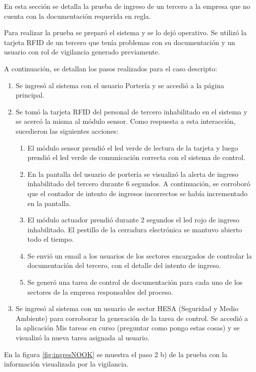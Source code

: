En esta sección se detalla la prueba de ingreso de un tercero a la empresa que no cuenta con la documentación requerida en regla.

Para realizar la prueba se preparó el sistema y se lo dejó operativo. Se utilizó la tarjeta RFID de un tercero que tenía problemas con su documentación y un usuario con rol de vigilancia generado previamente.

A continuación, se detallan los pasos realizados para el caso descripto:

\begin{enumerate}
\item Se ingresó al sistema con el usuario Portería y se accedió a la página principal.
\item Se tomó la tarjeta RFID del personal de tercero inhabilitado en el sistema y se acercó la misma al módulo sensor. Como respuesta a esta interacción, sucedieron las siguientes acciones:

	\begin{enumerate}
	\item El módulo sensor prendió el led verde de lectura de la tarjeta y luego prendió el led verde de comunicación correcta con el sistema de control.
	\item En la pantalla del usuario de portería se visualizó la alerta de ingreso inhabilitado del tercero durante 6 segundos. A continuación, se corroboró que el contador de intento de ingresos incorrectos se había incrementado en la pantalla.
	\item El módulo actuador prendió durante 2 segundos el led rojo de ingreso inhabilitado. El pestillo de la cerradura electrónica se mantuvo abierto todo el tiempo.
	\item Se envió un email a los usuarios de los sectores encargados de controlar la documentación del tercero, con el detalle del intento de ingreso.
	\item Se generó una tarea de control de documentación para cada uno de los sectores de la empresa responsables del proceso.
	\end{enumerate}

\item Se ingresó al sistema con un usuario de sector HESA (Seguridad y Medio Ambiente) para corroborar la generación de la tarea de control. Se accedió a la aplicación Mis tareas en curso (preguntar como pongo estas cosas) y se visualizó la nueva tarea asignada al usuario.
\end{enumerate}

En la figura \ref{fig:ingresNOOK} se muestra el paso 2 b) de la prueba con la información visualizada por la vigilancia.

